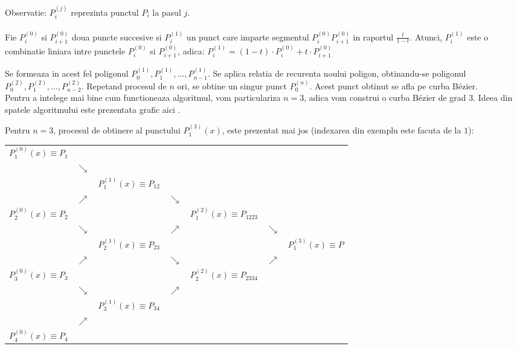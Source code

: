\documentclass{article}
\begin{document}
Observatie: $P_i^{(j)}$ reprezinta punctul $P_i$ la pasul $j$. \\\\


Fie $P_i^{(0)}$ si $P_{i+1}^{(0)}$ doua puncte succesive si $P_i^{(1)}$ un punct care imparte segmentul $P_i^{(0)}P_{i+1}^{(0)}$ in raportul $\frac{t}{1-t}$. Atunci, $P_i^{(1)}$ este o combinatie liniara intre punctele $P_i^{(0)}$ si $P_{i+1}^{(0)}$, adica: $P_i^{(1)} = (1-t) \cdot P_i^{(0)} + t \cdot P_{i+1}^{(0)}$

Se formeaza in acest fel poligonul $P_0^{(1)}, P_1^{(1)}, \dots, P_{n-1}^{(1)}$. Se aplica relatia de recurenta noului poligon, obtinandu-se poligonul $P_0^{(2)}, P_1^{(2)}, \dots, P_{n-2}^{(2)}$. Repetand procesul de $n$ ori, se obtine un singur punct $P_0^{(n)}$. Acest punct obtinut se afla pe curba B\'ezier. \\
 

Pentru a intelege mai bine cum functioneaza algoritmul, vom particulariza $n=3$, adica vom construi o curba B\'ezier de grad $3$. Ideea din spatele algoritmului este prezentata grafic aici \framebox[0.4cm][r]{\footnotemark}.



Pentru $n=3$, procesul de obtinere al punctului $P_1^{(3)}(x)$, este prezentat mai jos (indexarea din exemplu este facuta de la $1$):

\begin{center}
\begin{tabular}{ccccccc}
	$P_{1}^{(0)}(x) \equiv P_1$ & {} & {} \\
	{} & $\searrow $  & {}  & {}\\
	{} & {} &  $P_{1}^{(1)}(x) \equiv P_{12}$ & {}\\
	{} & $\nearrow $ & {}  &  $\searrow $\\
	$P_{2}^{(0)}(x) \equiv P_2$ & {} & {} & {} & $P_{1}^{(2)}(x) \equiv P_{1223}$\\
	{} & $\searrow $  & {} &  $\nearrow $ & {} & $\searrow $\\
	{} & {} &  $P_{2}^{(1)}(x) \equiv P_{23}$ & {} & {} & {} & $P_{1}^{(3)}(x) \equiv P$\\
	{} & $\nearrow $  & {} & $\searrow $ & {} & $\nearrow$\\
	$P_{3}^{(0)}(x) \equiv P_3$ & {}  & {}  & {} & $P_{2}^{(2)}(x) \equiv P_{2334}$\\
	{} & $\searrow $  &{} &  $\nearrow $\\
	{} & {} &  $P_{3}^{(1)}(x) \equiv P_{34}$ & {}\\
	{} & $\nearrow $  & {}  \\
	$P_{4}^{(0)}(x) \equiv P_4$ & {}  & {} & {} \\
\end{tabular}
\end{center}
\end{document}
